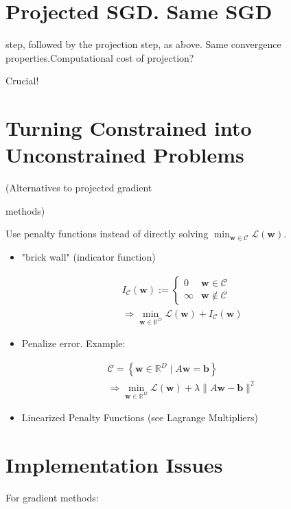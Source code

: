 \documentclass[10pt]{article}
\begin{document}
\section*{Projected SGD. Same SGD}
 step, followed by the projection step, as above. Same convergence properties.Computational cost of projection?

Crucial!

\section*{Turning Constrained into Unconstrained Problems}
(Alternatives to projected gradient

methods)

Use penalty functions instead of directly solving $\min _{\mathbf{w} \in \mathcal{C}} \mathcal{L}(\mathbf{w})$.

\begin{itemize}
  \item "brick wall" (indicator function)
\end{itemize}

$$
\begin{aligned}
& I_{\mathcal{C}}(\mathbf{w}):= \begin{cases}0 & \mathbf{w} \in \mathcal{C} \\
\infty & \mathbf{w} \notin \mathcal{C}\end{cases} \\
& \Rightarrow \min _{\mathbf{w} \in \mathbb{R}^{D}} \mathcal{L}(\mathbf{w})+I_{\mathcal{C}}(\mathbf{w})
\end{aligned}
$$

\begin{itemize}
  \item Penalize error. Example:
\end{itemize}

$$
\begin{aligned}
& \mathcal{C}=\left\{\mathbf{w} \in \mathbb{R}^{D} \mid A \mathbf{w}=\mathbf{b}\right\} \\
& \Rightarrow \min _{\mathbf{w} \in \mathbb{R}^{D}} \mathcal{L}(\mathbf{w})+\lambda\|A \mathbf{w}-\mathbf{b}\|^{2}
\end{aligned}
$$

\begin{itemize}
  \item Linearized Penalty Functions (see Lagrange Multipliers)
\end{itemize}

\section*{Implementation Issues}
For gradient methods:
\end{document}
